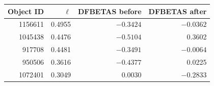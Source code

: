 \begin{tabular}{rrrr}\toprule
Object ID & $\ell$ & DFBETAS before & DFBETAS after \\ \midrule
1156611 & 0.4955 & $-0.3424$ & $-0.0362$ \\
1045438 & 0.4476 & $-0.5104$ & 0.3602 \\
917708 & 0.4481 & $-0.3491$ & $-0.0064$ \\
950506 & 0.3616 & $-0.4377$ & 0.0225 \\
1072401 & 0.3049 & 0.0030 & $-0.2833$ \\
\bottomrule\end{tabular}
